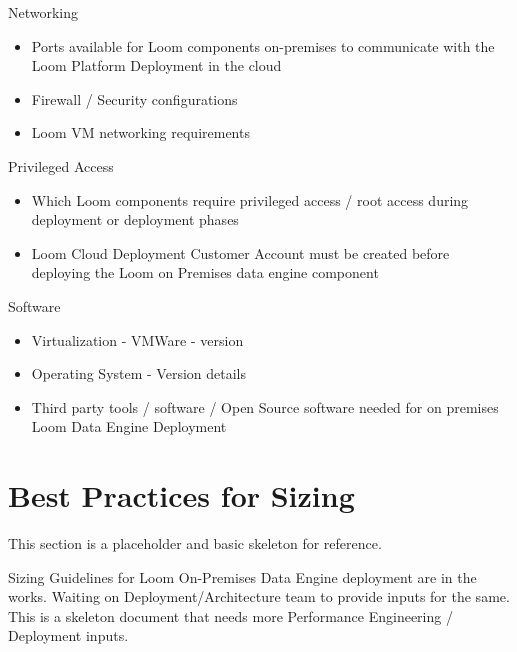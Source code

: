 \documentclass[letterpaper,10pt,english]{sphinxmanual}
\begin{document}
Networking
\begin{itemize}
\item {} 
Ports available for Loom components on-premises to communicate with the Loom Platform Deployment in the cloud

\item {} 
Firewall / Security configurations

\item {} 
Loom VM networking requirements

\end{itemize}

Privileged Access
\begin{itemize}
\item {} 
Which Loom components require privileged access / root access during deployment or deployment phases

\item {} 
Loom Cloud Deployment Customer Account must be created before deploying the Loom on Premises data engine component

\end{itemize}

Software
\begin{itemize}
\item {} 
Virtualization - VMWare - version

\item {} 
Operating System - Version details

\item {} 
Third party tools / software / Open Source software needed for on premises Loom Data Engine Deployment

\end{itemize}


\section{Best Practices for Sizing}
\label{\detokenize{loom_trbs_faq:best-practices-for-sizing}}
This section is a placeholder and basic skeleton for reference.

Sizing Guidelines for Loom On-Premises Data Engine deployment are in the works.  Waiting on Deployment/Architecture team to provide inputs for the same.  This is a skeleton document that needs more Performance Engineering / Deployment inputs.
\end{document}
